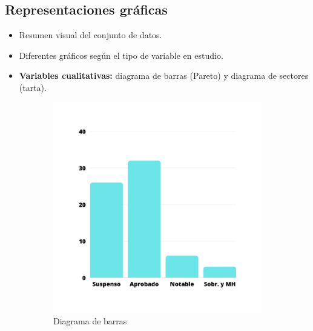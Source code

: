 \subsection{Representaciones gráficas}
\begin{itemize}
	\item Resumen visual del conjunto de datos.
	\item Diferentes gráficos según el tipo de variable en estudio.
	\item \textbf{Variables cualitativas:} diagrama de barras (Pareto) y diagrama de sectores (tarta).
\end{itemize}
\begin{figure}[h]
	\begin{subfigure}{0.5\textwidth}
		\centering
		\includegraphics[width=1\linewidth]{"Temas/Imagenes/Tema 1/Diagrama de barras"}
		\caption*{Diagrama de barras}
	\end{subfigure}
	\begin{subfigure}{0.5\textwidth}
		\centering

\end{subfigure}
\end{figure}
